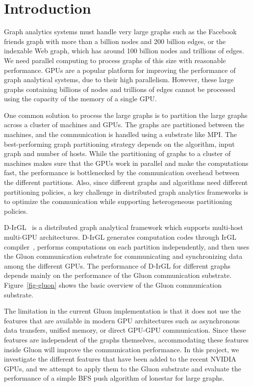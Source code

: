 \section{Introduction}
\label{sec-intro}

Graph analytics systems must handle very large graphs such as the Facebook friends graph with more than a billion nodes and 200 billion edges, or the indexable Web graph, which has around 100 billion nodes and trillions of edges. We need parallel computing to process graphs of this size with reasonable performance. GPUs are a popular platform for improving the performance of graph analytical systems, due to their high parallelism. However, these large graphs containing billions of nodes and trillions of edges cannot be processed using the capacity of the memory of a single GPU. 

One common solution to process the large graphs is to partition the large graphs across a cluster of machines and GPUs. The graphs are partitioned between the machines, and the communication is handled using a substrate like MPI. The best-performing graph partitioning strategy depends on the algorithm, input graph and number of hosts. While the partitioning of graphs to a cluster of machines makes sure that the GPUs work in parallel and make the computations fast, the performance is bottlenecked by the communication overhead between the different partitions. Also, since different graphs and algorithms need different partitioning policies, a key challenge in distributed graph analytics frameworks is to optimize the communication while supporting heterogeneous partitioning policies. 


D-IrGL~\cite{dathathri2018gluon} is a distributed graph analytical framework which supports multi-host multi-GPU architectures. D-IrGL generates computation codes through IrGL compiler~\cite{pai2016compiler},
performs computations on each partition independently, and then uses the Gluon communication substrate for communicating and synchronizing data among the different GPUs. The performance of D-IrGL for different graphs depends mainly on the performance of the Gluon communication substrate. Figure~\ref{fig-gluon} shows the basic overview of the Gluon communication substrate. 

The limitation in the current Gluon implementation is that it does not use the features that are available in modern GPU architectures such as asynchronous data transfers, unified memory, or direct GPU-GPU communication. Since these features are independent of the graphs themselves, accommodating these features inside Gluon will improve the communication performance. In this project, we  investigate the different features that have been added to the recent NVIDIA GPUs, and we attempt to apply them to the Gluon substrate and evaluate the performance of a simple BFS push algorithm of lonestar for large graphs. 

